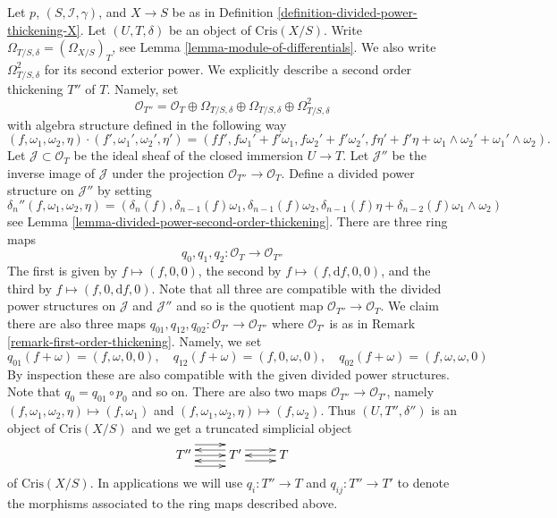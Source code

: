 \begin{remark}
\label{remark-second-order-thickening}
Let $p$, $(S, \mathcal{I}, \gamma)$, and $X \to S$ be as in
Definition \ref{definition-divided-power-thickening-X}.
Let $(U, T, \delta)$ be an object of $\text{Cris}(X/S)$.
Write $\Omega_{T/S, \delta} = (\Omega_{X/S})_T$, see
Lemma \ref{lemma-module-of-differentials}.
We also write $\Omega^2_{T/S, \delta}$ for its second exterior
power. We explicitly describe a second order thickening $T''$ of
$T$. Namely, set
$$
\mathcal{O}_{T''} =
\mathcal{O}_T \oplus \Omega_{T/S, \delta} \oplus \Omega_{T/S, \delta}
\oplus \Omega^2_{T/S, \delta}
$$
with algebra structure defined in the following way
$$
(f, \omega_1, \omega_2, \eta) \cdot
(f', \omega_1', \omega_2', \eta') =
(ff', f\omega_1' + f'\omega_1, f\omega_2' + f'\omega_2',
f\eta' + f'\eta + \omega_1 \wedge \omega_2' + \omega_1' \wedge \omega_2).
$$
Let $\mathcal{J} \subset \mathcal{O}_T$
be the ideal sheaf of the closed immersion $U \to T$. Let
$\mathcal{J}''$ be the inverse image of $\mathcal{J}$ under the
projection $\mathcal{O}_{T''} \to \mathcal{O}_T$.
Define a divided power structure on $\mathcal{J}''$ by setting
$$
\delta_n''(f, \omega_1, \omega_2, \eta) =
(\delta_n(f), \delta_{n - 1}(f)\omega_1, \delta_{n - 1}(f)\omega_2,
\delta_{n - 1}(f)\eta + \delta_{n - 2}(f)\omega_1 \wedge \omega_2)
$$
see Lemma \ref{lemma-divided-power-second-order-thickening}.
There are three ring maps
$$
q_0, q_1, q_2 : \mathcal{O}_T \to \mathcal{O}_{T''}
$$
The first is given by $f \mapsto (f, 0, 0)$, the second by
$f \mapsto (f, \text{d}f, 0, 0)$, and the third by
$f \mapsto (f, 0, \text{d}f, 0)$. Note that all three are compatible with the
divided power structures on $\mathcal{J}$ and $\mathcal{J}''$
and so is the quotient map $\mathcal{O}_{T''} \to \mathcal{O}_T$.
We claim there are also three maps
$q_{01}, q_{12}, q_{02} : \mathcal{O}_{T'} \to \mathcal{O}_{T''}$
where $\mathcal{O}_{T'}$ is as in Remark \ref{remark-first-order-thickening}.
Namely, we set
$$
q_{01}(f + \omega) = (f, \omega, 0, 0),\quad
q_{12}(f + \omega) = (f, 0, \omega, 0),\quad
q_{02}(f + \omega) = (f, \omega, \omega, 0)
$$
By inspection these are also compatible with the given divided power
structures. Note that $q_0 = q_{01} \circ p_0$ and so on. There are
also two maps $\mathcal{O}_{T''} \to \mathcal{O}_{T'}$, namely
$(f, \omega_1, \omega_2, \eta) \mapsto (f, \omega_1)$ and
$(f, \omega_1, \omega_2, \eta) \mapsto (f, \omega_2)$.
Thus $(U, T'', \delta'')$ is an object of $\text{Cris}(X/S)$
and we get a truncated simplicial object
$$
\xymatrix{
T''
\ar@<2ex>[r]
\ar@<0ex>[r]
\ar@<-2ex>[r]
&
T'
\ar@<1ex>[r]
\ar@<-1ex>[r]
\ar@<1ex>[l]
\ar@<-1ex>[l]
&
T
\ar@<0ex>[l]
}
$$
of $\text{Cris}(X/S)$. In applications we will use $q_i : T'' \to T$ and
$q_{ij} : T'' \to T'$ to denote the morphisms associated to the
ring maps described above.
\end{remark}






